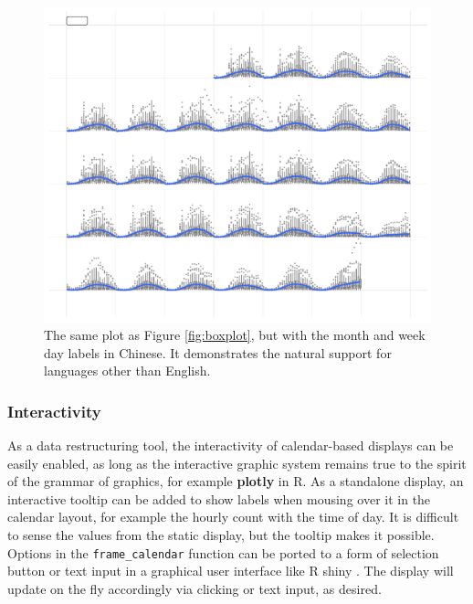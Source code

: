 \documentclass[12pt]{article}
\begin{document}
\begin{figure}

{\centering \includegraphics[width=\textwidth]{figure/chn-1} 

}

\caption{The same plot as Figure \ref{fig:boxplot}, but with the month and week day labels in Chinese. It demonstrates the natural support for languages other than English.}\label{fig:chn}
\end{figure}



\hypertarget{interactivity}{%
\subsubsection{Interactivity}\label{interactivity}}

As a data restructuring tool, the interactivity of calendar-based displays can be easily enabled, as long as the interactive graphic system remains true to the spirit of the grammar of graphics, for example \textbf{plotly} \citep{plotly} in R. As a standalone display, an interactive tooltip can be added to show labels when mousing over it in the calendar layout, for example the hourly count with the time of day. It is difficult to sense the values from the static display, but the tooltip makes it possible. Options in the \texttt{frame\_calendar} function can be ported to a form of selection button or text input in a graphical user interface like R shiny \citep{R-shiny}. The display will update on the fly accordingly via clicking or text input, as desired.
\end{document}
